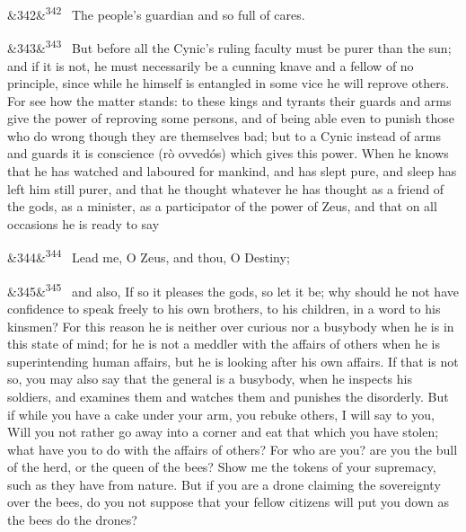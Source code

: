 \documentclass[12pt]{article}
\newcommand{\para}[1][]{\par\noindent\ifx&#1&\else\textsuperscript{\footnotesize #1}~\fi}
\begin{document}
\para[342] The people's guardian and so full of cares.

\para[343] But before all the Cynic's ruling faculty must be purer than the sun; and if it is not, he must necessarily be a cunning knave and a fellow of no principle, since while he himself is entangled in some vice he will reprove others. For see how the matter stands: to these kings and tyrants their guards and arms give the power of reproving some persons, and of being able even to punish those who do wrong though they are themselves bad; but to a Cynic instead of arms and guards it is conscience (rò ovvedós) which gives this power. When he knows that he has watched and laboured for mankind, and has slept pure, and sleep has left him still purer, and that he thought whatever he has thought as a friend of the gods, as a minister, as a participator of the power of Zeus, and that on all occasions he is ready to say

\para[344] Lead me, O Zeus, and thou, O Destiny;

\para[345] and also, If so it pleases the gods, so let it be; why should he not have confidence to speak freely to his own brothers, to his children, in a word to his kinsmen? For this reason he is neither over curious nor a busybody when he is in this state of mind; for he is not a meddler with the affairs of others when he is superintending human affairs, but he is looking after his own affairs. If that is not so, you may also say that the general is a busybody, when he inspects his soldiers, and examines them and watches them and punishes the disorderly. But if while you have a cake under your arm, you rebuke others, I will say to you, Will you not rather go away into a corner and eat that which you have stolen; what have you to do with the affairs of others? For who are you? are you the bull of the herd, or the queen of the bees? Show me the tokens of your supremacy, such as they have from nature. But if you are a drone claiming the sovereignty over the bees, do you not suppose that your fellow citizens will put you down as the bees do the drones?
\end{document}
